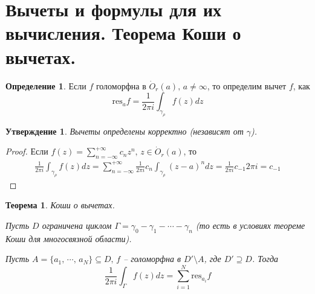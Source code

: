 \documentclass[a4paper,12pt]{article}
\theoremstyle{plain}
\newtheorem{theorem}{Теорема}[section]
\newtheorem{proposition}{Утверждение}[section]
\theoremstyle{definition}
\newtheorem{definition}{Определение}[section]
\theoremstyle{remark}
\begin{document}
\section{Вычеты и формулы для их вычисления. Теорема Коши о вычетах.}
\begin{definition}
	Если $f$ голоморфна в $\dot{O}_r(a),\, a \neq \infty$, то определим вычет $f$, как
	\[
		\text{res}_af = \frac{1}{2\pi i}\int_{\gamma_\rho}f(z)dz
	\]
\end{definition}

\begin{proposition}
	Вычеты определены корректно (независят от $\gamma$).
\end{proposition}

\begin{proof}
	Если $f(z) = \sum_{n = -\infty}^{+\infty} c_nz^n,\, z \in \dot{O}_r(a)$, то
	\begin{align*}
		\frac{1}{2\pi i}\int_{\gamma_\rho}f(z)dz = \sum_{n = -\infty}^{+\infty}\frac{1}{2\pi i}c_n\int_{\gamma_\rho}(z - a)^ndz = \frac{1}{2\pi i}c_{-1}2\pi i = c_{-1}
	\end{align*}
\end{proof}

\begin{theorem}
	Коши о вычетах.

	Пусть $D$ ограничена циклом $\Gamma = \gamma_0 - \gamma_1 - \cdots - \gamma_n$ (то есть в условиях теореме Коши для многосвязной области).

	Пусть $A = \{a_1,\,\cdots,\, a_N\} \subseteq D,\, f$ -- голоморфна в $D' \setminus A$, где $D' \supseteq D$. Тогда
	\[
		\frac{1}{2\pi i}\int_\Gamma f(z)dz = \sum_{i = 1}^N \text{res}_{a_i} f
	\]
\end{theorem}
\end{document}
